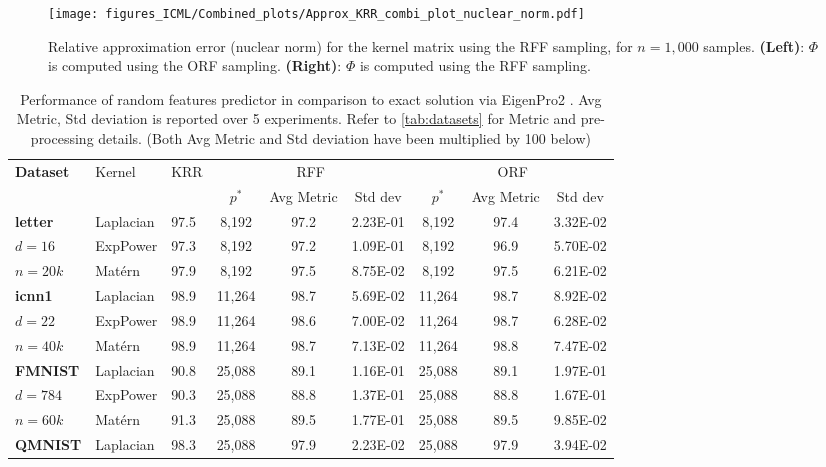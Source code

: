 \documentclass{article}
\def\matern{Mat\'ern\,}
\def\cite{\citep}
\theoremstyle{plain}
\begin{document}
\begin{figure}
\texttt{[image: figures\_ICML/Combined\_plots/Approx\_KRR\_combi\_plot\_nuclear\_norm.pdf]}
\caption{\label{fig:approx_nuc_norm}Relative approximation error (nuclear norm) for the kernel matrix using the RFF sampling, for $n=1,000$ samples. \textbf{(Left)}: $\Phi$ is computed using the ORF sampling. \textbf{(Right)}: $\Phi$ is computed using the RFF sampling.}
\end{figure}

\begin{table}[!htb]
    \centering
    \caption{\label{tab:krr}Performance of random features predictor in comparison to exact solution via EigenPro2 \cite{ma2019kernel}. Avg Metric, Std deviation is reported over 5 experiments. Refer to \cref{tab:datasets} for Metric and pre-processing details. (Both Avg Metric and Std deviation have been multiplied by 100 below)}
    \begin{tabular}{lllcccccc}
    \toprule
        \textbf{Dataset} & Kernel& KRR & \multicolumn{3}{c}{RFF} &  \multicolumn{3}{c}{ORF}  \\
        \cmidrule(lr){4-6}  \cmidrule(lr){7-9}
        ~ & ~ & ~ & $p^{*}$ & Avg Metric & Std dev & $p^{*}$ & Avg Metric & Std dev \\ \midrule
        \textbf{letter} & Laplacian & 97.5 &  8,192  & 97.2 & 2.23E-01 &  8,192  & 97.4 & 3.32E-02 \\ 
        $d=16$ & ExpPower & 97.3 &  8,192  & 97.2 & 1.09E-01 &  8,192  & 96.9 & 5.70E-02 \\ 
        $n=20k$ & \matern & 97.9 &  8,192  & 97.5 & 8.75E-02 &  8,192  & 97.5 & 6.21E-02 \\ \midrule
        \textbf{icnn1} & Laplacian & 98.9 &  11,264  & 98.7 & 5.69E-02 &  11,264  & 98.7 & 8.92E-02 \\ 
        $d=22$ & ExpPower & 98.9 &  11,264  & 98.6 & 7.00E-02 &  11,264  & 98.7 & 6.28E-02 \\ 
        $n=40k$ & \matern & 98.9 &  11,264  & 98.7 & 7.13E-02 &  11,264  & 98.8 & 7.47E-02 \\ \midrule
        \textbf{FMNIST} & Laplacian & 90.8 &  25,088  & 89.1 & 1.16E-01 &  25,088  & 89.1 & 1.97E-01 \\ 
        $d=784$ & ExpPower & 90.3 &  25,088  & 88.8 & 1.37E-01 &  25,088  & 88.8 & 1.67E-01 \\ 
        $n=60k$ & \matern & 91.3 &  25,088  & 89.5 & 1.77E-01 &  25,088  & 89.5 & 9.85E-02 \\ \midrule
        \textbf{QMNIST} & Laplacian & 98.3 &  25,088  & 97.9 & 2.23E-02 &  25,088  & 97.9 & 3.94E-02 \\ 

\end{tabular}
\end{table}
\end{document}
